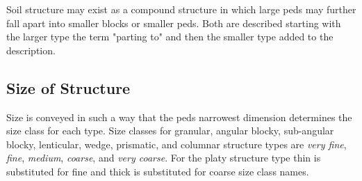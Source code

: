 \documentclass[a5paper]{report}
\begin{document}
Soil structure may exist as a compound structure in which large peds may further fall apart into smaller blocks or smaller peds. Both are described starting with the larger type the term "parting to" and then the smaller type added to the description.
    
\subsection{Size of Structure}
    
Size is conveyed in such a way that the peds narrowest dimension  determines the size class for each type. Size classes for granular, angular blocky, sub-angular blocky, lenticular, wedge, prismatic, and columnar structure types are \emph{very fine}, \emph{fine}, \emph{medium}, \emph{coarse}, and \emph{very coarse}. For the platy structure type thin is substituted for fine and thick is substituted for coarse size class names.

\end{document}
